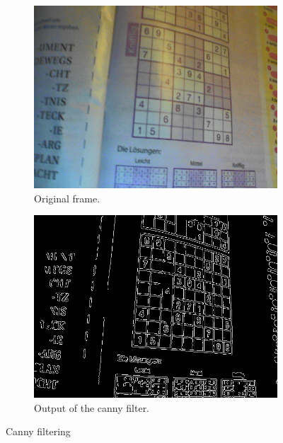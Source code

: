 \documentclass[
a4paper,     %
12pt         %
]{scrartcl}  %
\begin{document}
\begin{figure}
    \centering
    \begin{subfigure}[b]{0.45\textwidth}
        \centering
        \includegraphics[width=\textwidth]{imgs/canny_frame.png}
        \caption{Original frame.}
    \end{subfigure}
    \begin{subfigure}[b]{0.45\textwidth}
        \centering
        \includegraphics[width=\textwidth]{imgs/canny.png}
        \caption{Output of the canny filter.}
    \end{subfigure}
    \caption{Canny filtering}
    \label{fig:canny}
\end{figure}
\end{document}
